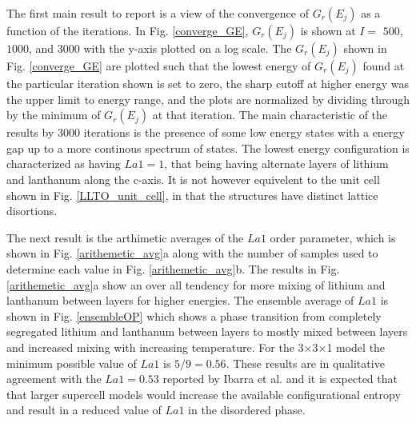 \documentclass[aps,pre,reprint,superscriptaddress,showkeys]{revtex4-1}
\begin{document}
The first main result to report is a view of the convergence of $G_r(E_j)$ as a function of the iterations. In Fig. \ref{converge_GE},  $G_r(E_j)$ is shown at  $I= $ $500$, $1000$, and $3000$ with the y-axis plotted on a log scale. The  $G_r(E_j)$ shown in Fig. \ref{converge_GE}  are plotted such that the lowest energy of $G_r(E_j)$ found at the particular iteration shown is set to zero, the sharp cutoff at higher energy was the upper limit to energy range, and the plots are normalized by dividing through by the minimum of $G_r(E_j)$ at that iteration.  The main characteristic of the results by 3000 iterations is the presence of some low energy states with a energy gap up to a more continous spectrum of states. The lowest energy configuration is  characterized as having  $La1=1$, that being having alternate layers of lithium and lanthanum along the c-axis. It is not however equivelent to the unit cell shown in Fig. \ref{LLTO_unit_cell}, in that the structures have distinct lattice disortions. 


The next result is the arthimetic averages of the $La1$  order parameter, which is  shown in Fig. \ref{arithemetic_avg}a along with the number of samples used to determine each value in Fig. \ref{arithemetic_avg}b. The results in Fig. \ref{arithemetic_avg}a show an over all tendency for more mixing of lithium and lanthanum between layers for higher energies. The ensemble average of $La1$ is shown in Fig. \ref{ensembleOP} which shows a phase transition from completely segregated lithium and lanthanum between layers to mostly mixed between layers and increased mixing with increasing temperature. For the 3$\times$3$\times$1 model the minimum possible value of $La1$ is $5/9 = 0.56$. These results are in qualitative agreement with the $La1=0.53$ reported by Ibarra et al. \cite{P4mmmstrucuture}  and it is expected that that larger supercell models would increase the available configurational entropy and result in a reduced value of $La1$ in the disordered phase. 
\end{document}
